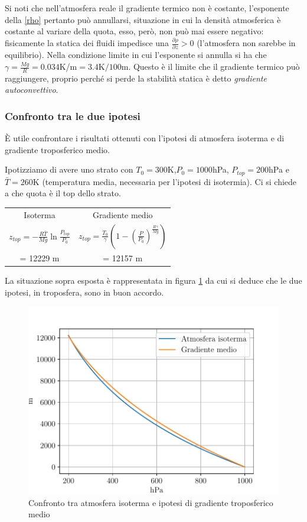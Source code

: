 Si noti che nell'atmosfera reale il gradiente termico non è costante, l'esponente della \eqref{rho} pertanto può annullarsi, situazione in cui la densità atmosferica è costante al variare della quota, esso, però, non può mai essere negativo: fisicamente la statica dei fluidi impedisce una $\frac{\partial \rho}{\partial z} >0$ (l'atmosfera non sarebbe in equilibrio). Nella condizione limite in cui l'esponente si annulla si ha che $\gamma =\frac{Mg}{R}=0.034$K/m$=3.4$K$/100$m. Questo è il limite che il gradiente termico può raggiungere, proprio perché si perde la stabilità statica è detto \emph{gradiente autoconvettivo}. 

\subsubsection{Confronto tra le due ipotesi}
È utile confrontare i risultati ottenuti con l'ipotesi di atmosfera isoterma e di gradiente troposferico medio. 

Ipotizziamo di avere uno strato con $T_0=300$K,$P_0=1000$hPa, $P_{top}=200$hPa e $\bar{T}=260$K (temperatura media, necessaria per l'ipotesi di isotermia). Ci si chiede a che quota è il top dello strato. 
\begin{table}[h]
	\centering
	\begin{tabular}{c|c}
		Isoterma & Gradiente medio \\
		$z_{top}=-\frac{R\bar{T}}{Mg}\ln\frac{P_{top}}{P_0}$ & $z_{top}=\frac{T_0}{\gamma}\left(1-\left(\frac{P}{P_0}\right)^{\frac{R\gamma}{Mg}}\right)$\\
		= 12229 m & = 12157 m
	\end{tabular}
\end{table}

La situazione sopra esposta è rappresentata in figura \ref{fig:iso_vs_grad} da cui si deduce che le due ipotesi, in troposfera, sono in buon accordo. 

\begin{figure}[h]     				\centering                                                                  
   \includegraphics[width=.65\textwidth]{figures/iso_vs_grad.pdf} 
	\caption{Confronto tra atmosfera isoterma e ipotesi di gradiente troposferico medio}          
   \label{fig:iso_vs_grad}
\end{figure}         
